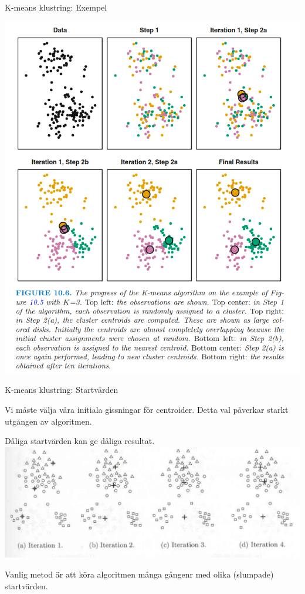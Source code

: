\documentclass[10pt,english]{beamer}
\begin{document}
\begin{frame}{K-means klustring: Exempel}

    \includegraphics[height=\textheight]{figs/k-means Illustration2.png}
    
\end{frame}

\begin{frame}{K-means klustring: Startvärden}

    Vi måste välja våra initiala gissningar för centroider. Detta val påverkar starkt utgången av algoritmen.

    Dåliga startvärden kan ge dåliga resultat.
    \includegraphics[width = \textwidth]{figs/dåliga start värden.png}

    Vanlig metod är att köra algoritmen många gångenr med olika (slumpade) startvärden.
    
\end{frame}
\end{document}
